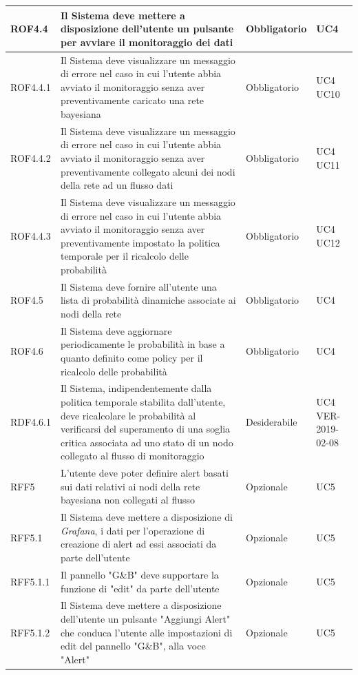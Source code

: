 \begin{center}
\begin{longtable}[c]{|m{}|m{}|m{}|m{}|}
\hline
ROF4.4 & Il Sistema deve mettere a disposizione dell'utente un pulsante per avviare il monitoraggio dei dati & Obbligatorio & UC4\\
\hline
\rowcolor{grigio}ROF4.4.1 & Il Sistema deve visualizzare un messaggio di errore nel caso in cui l'utente abbia avviato il monitoraggio senza aver preventivamente caricato una rete bayesiana & Obbligatorio & UC4 UC10\\
\hline
ROF4.4.2 & Il Sistema deve visualizzare un messaggio di errore nel caso in cui l'utente abbia avviato il monitoraggio senza aver preventivamente collegato alcuni dei nodi della rete ad un flusso dati & Obbligatorio & UC4 UC11\\
\hline
\rowcolor{grigio}ROF4.4.3 & Il Sistema deve visualizzare un messaggio di errore nel caso in cui l'utente abbia avviato il monitoraggio senza aver preventivamente impostato la politica temporale per il ricalcolo delle probabilità & Obbligatorio & UC4 UC12\\
\hline
ROF4.5 & Il Sistema deve fornire all'utente una lista di probabilità dinamiche associate ai nodi della rete & Obbligatorio & UC4\\
\hline
\rowcolor{grigio}ROF4.6 & Il Sistema deve aggiornare periodicamente le probabilità in base a quanto definito come policy per il ricalcolo delle probabilità & Obbligatorio & UC4\\
\hline
RDF4.6.1 & Il Sistema, indipendentemente dalla politica temporale stabilita dall'utente, deve ricalcolare le probabilità al verificarsi del superamento di una soglia critica associata ad uno stato di un nodo collegato al flusso di monitoraggio & Desiderabile & UC4 VER-2019-02-08\\
\hline
\rowcolor{grigio}RFF5 & L'utente deve poter definire alert basati sui dati relativi ai nodi della rete bayesiana non collegati al flusso & Opzionale & UC5\\
\hline
RFF5.1 & Il Sistema deve mettere a disposizione di \textit{Grafana}, i dati per l'operazione di creazione di alert ad essi associati da parte dell'utente & Opzionale & UC5\\
\hline
\rowcolor{grigio}RFF5.1.1 & Il pannello "G\&B" deve supportare la funzione di "edit" da parte dell'utente & Opzionale & UC5\\
\hline
RFF5.1.2 & Il Sistema deve mettere a disposizione dell'utente un pulsante "Aggiungi Alert" che conduca l'utente alle impostazioni di edit del pannello "G\&B", alla voce "Alert" & Opzionale & UC5\\
\hline

\end{longtable}
\end{center}
